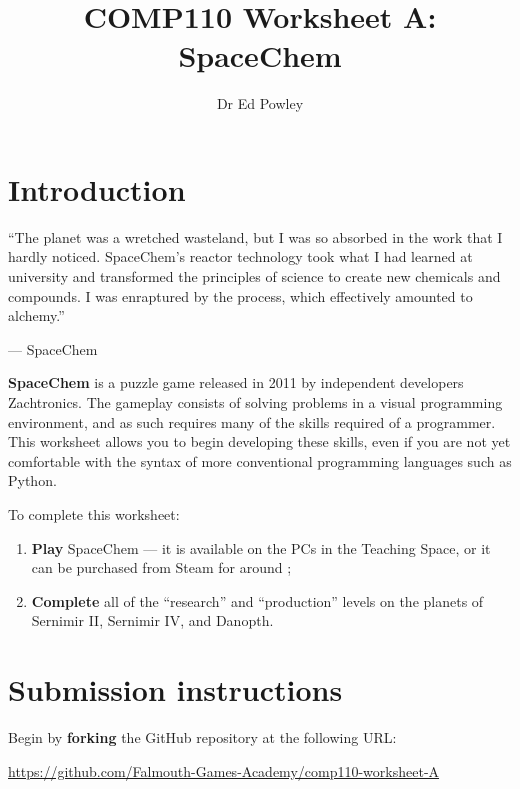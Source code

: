 \documentclass{../../../fal_assignment}
\title{COMP110 Worksheet A: SpaceChem}
\author{Dr Ed Powley}
\begin{document}
\maketitle

\section*{Introduction}

\begin{marginquote}
``The planet was a wretched wasteland, but I was so absorbed in the work that I hardly noticed. SpaceChem's reactor technology took what I had learned at university and transformed the principles of science to create new chemicals and compounds. I was enraptured by the process, which effectively amounted to alchemy.''

--- SpaceChem
\end{marginquote}

\textbf{SpaceChem} is a puzzle game released in 2011 by independent developers Zachtronics. The gameplay consists of solving problems in a visual programming environment, and as such requires many of the skills required of a programmer. This worksheet allows you to begin developing these skills, even if you are not yet comfortable with the syntax of more conventional programming languages such as Python.

To complete this worksheet:
\begin{enumerate}[label=(\alph*)]
	\item \textbf{Play} SpaceChem --- it is available on the PCs in the Teaching Space,
		or it can be purchased from Steam for around ;
 	\item \textbf{Complete} all of the ``research'' and ``production'' levels on the planets of Sernimir II, Sernimir IV, and Danopth.
\end{enumerate}

\section*{Submission instructions}

Begin by \textbf{forking} the GitHub repository at the following URL:

\url{https://github.com/Falmouth-Games-Academy/comp110-worksheet-A}
\end{document}
